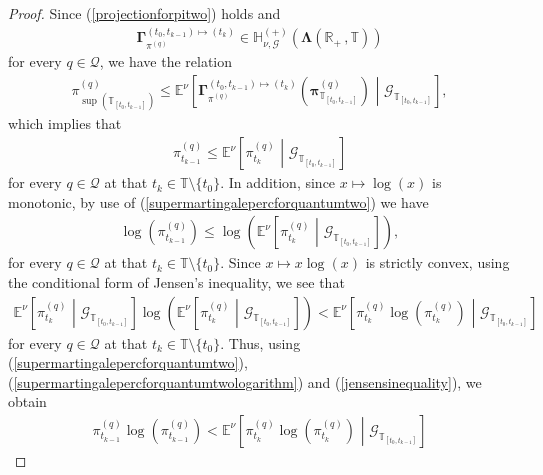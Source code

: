\documentclass[12pt,a4paper]{article}
\def\R{\mathbb{R}}
\def\T{\mathbb{T}}
\def\G{\mathscr{G}}
\begin{document}
\begin{proof}
Since (\ref{projectionforpitwo}) holds and 
\begin{align}
\boldsymbol{\Gamma}_{\pi^{(q)}}^{(t_0,t_{k-1})\mapsto(t_k)} \in \mathbb{H}^{(+)}_{\nu,\G}(\boldsymbol{\Lambda}(\R_+ \,, \T))  
\end{align}
for every $q\in\mathcal{Q}$, we have the relation
\begin{align}
\pi^{(q)}_{\sup(\T_{[t_0,t_{k-1}]})} \leq \mathbb{E}^{\nu}\left[\boldsymbol{\Gamma}_{\pi^{(q)}}^{(t_0,t_{k-1})\mapsto(t_k)}\left(  \boldsymbol{\pi}_{\T_{[t_0,t_{k-1}]}}^{(q)} \right)  \,\, \left| \,\, \G_{\T_{[t_0,t_{k-1}]}} \right.\right],  
\end{align}
which implies that
\begin{align}
  \pi^{(q)}_{t_{k-1}}  \leq \mathbb{E}^{\nu}\left[\pi^{(q)}_{t_{k}}  \,\, \left| \,\, \G_{\T_{[t_0,t_{k-1}]}} \right.\right]  \label{supermartingalepercforquantumtwo}
\end{align}
%
for every $q\in\mathcal{Q}$ at that $t_k\in\T\setminus\{t_0\}$. In addition, since $x \mapsto \log(x)$ is monotonic, by use of (\ref{supermartingalepercforquantumtwo}) we have 
\begin{align}
\log\left( \pi^{(q)}_{t_{k-1}}\right)  \leq \log\left(\mathbb{E}^{\nu}\left[\pi^{(q)}_{t_{k}}  \,\, \left| \,\, \G_{\T_{[t_0,t_{k-1}]}} \right.\right]\right),  \label{supermartingalepercforquantumtwologarithm}
\end{align}
for every $q\in\mathcal{Q}$ at that $t_k\in\T\setminus\{t_0\}$. Since $x \mapsto x\log(x)$ is strictly convex, using the conditional form of Jensen's inequality, we see that
\begin{align}
\mathbb{E}^{\nu}\left[\pi^{(q)}_{t_{k}}  \,\, \left| \,\, \G_{\T_{[t_0,t_{k-1}]}} \right.\right]\log\left(\mathbb{E}^{\nu}\left[\pi^{(q)}_{t_{k}}  \,\, \left| \,\, \G_{\T_{[t_0,t_{k-1}]}} \right.\right]\right) < \mathbb{E}^{\nu}\left[\pi^{(q)}_{t_{k}}\log\left(\pi^{(q)}_{t_{k}} \right)  \,\, \left| \,\, \G_{\T_{[t_0,t_{k-1}]}} \right.\right]  \label{jensensinequality}
\end{align}
for every $q\in\mathcal{Q}$ at that $t_k\in\T\setminus\{t_0\}$. Thus, using (\ref{supermartingalepercforquantumtwo}), (\ref{supermartingalepercforquantumtwologarithm}) and (\ref{jensensinequality}), we obtain
\begin{align}
\pi^{(q)}_{t_{k-1}}\log\left( \pi^{(q)}_{t_{k-1}}\right) < \mathbb{E}^{\nu}\left[\pi^{(q)}_{t_{k}}\log\left(\pi^{(q)}_{t_{k}} \right)  \,\, \left| \,\, \G_{\T_{[t_0,t_{k-1}]}} \right.\right]  \label{jensensinequalitytwo}

\end{align}
\end{proof}
\end{document}
